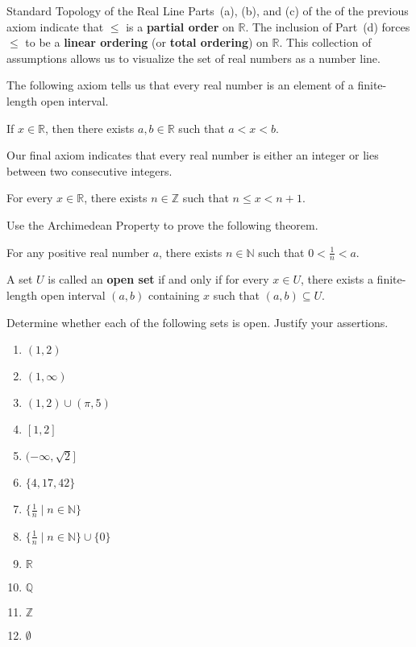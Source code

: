 \begin{section}{Standard Topology of the Real Line}
Parts~(a), (b), and (c) of the of the previous axiom indicate that $\leq$ is a \textbf{partial order} on $\mathbb{R}$. The inclusion of Part~(d) forces $\leq$ to be a \textbf{linear ordering} (or \textbf{total ordering}) on $\mathbb{R}$.  This collection of assumptions allows us to visualize the set of real numbers as a number line.

The following axiom tells us that every real number is an element of a finite-length open interval.

\begin{axiom}
If $x\in\mathbb{R}$, then there exists $a,b\in\mathbb{R}$ such that $a<x<b$.
\end{axiom}

Our final axiom indicates that every real number is either an integer or lies between two consecutive integers.

\begin{axiom}
For every $x\in\mathbb{R}$, there exists $n\in\mathbb{Z}$ such that $n \leq x < n + 1$.
\end{axiom}

Use the Archimedean Property to prove the following theorem.

\begin{theorem}
For any positive real number $a$, there exists $n\in \mathbb{N}$ such that $0<\frac{1}{n}<a$.
\end{theorem}

\begin{definition}
A set $U$ is called an \textbf{open set} if and only if for every $x \in U$, there exists a finite-length open interval $(a,b)$ containing $x$ such that $(a,b)\subseteq U$.
\end{definition}

\begin{problem}\label{prob:open or not}
Determine whether each of the following sets is open. Justify your assertions.
\begin{multicols}{2}
\begin{enumerate}[label=\textrm{(\alph*)}]
\item $(1,2)$
\item $(1,\infty)$
\item $(1,2)\cup (\pi,5)$
\item $[1,2]$
\item $(-\infty,\sqrt{2}]$
\item $\{4,17,42\}$
\item $\{\frac{1}{n}\mid n\in \mathbb{N}\}$
\item $\{\frac{1}{n}\mid n\in \mathbb{N}\}\cup \{0\}$
\item $\mathbb{R}$
\item $\mathbb{Q}$
\item $\mathbb{Z}$
\item $\emptyset$
\end{enumerate}
\end{multicols}
\end{problem}


\end{section}
